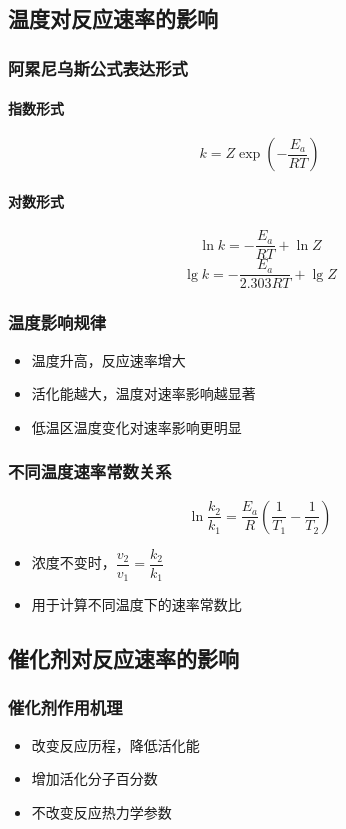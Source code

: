 \subsection{温度对反应速率的影响}
\subsubsection{阿累尼乌斯公式表达形式}
\paragraph{指数形式}
\[
k = Z \exp\left(-\frac{E_a}{RT}\right)
\]
\paragraph{对数形式}
\[
\ln k = -\frac{E_a}{RT} + \ln Z
\]
\[
\lg k = -\frac{E_a}{2.303RT} + \lg Z
\]

\subsubsection{温度影响规律}
\begin{itemize}
\item 温度升高，反应速率增大
\item 活化能越大，温度对速率影响越显著
\item 低温区温度变化对速率影响更明显
\end{itemize}

\subsubsection{不同温度速率常数关系}
\[
\ln\frac{k_2}{k_1} = \frac{E_a}{R}\left(\frac{1}{T_1} - \frac{1}{T_2}\right)
\]
\begin{itemize}
\item 浓度不变时，$\dfrac{v_2}{v_1} = \dfrac{k_2}{k_1}$
\item 用于计算不同温度下的速率常数比
\end{itemize}

\subsection{催化剂对反应速率的影响}
\subsubsection{催化剂作用机理}
\begin{itemize}
\item 改变反应历程，降低活化能
\item 增加活化分子百分数
\item 不改变反应热力学参数
\end{itemize}

